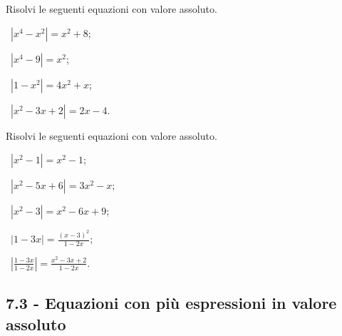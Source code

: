 \begin{esercizio}[\Ast]
 \label{ese:7.14}
Risolvi le seguenti equazioni con valore assoluto.
\begin{multicols}{2}
 \begin{enumeratea}
 \item~$\left|x^4-x^2\right|=x^2+8$;
 \item~$\left|x^4-9\right|=x^2$;
 \item~$\left|1-x^2\right|=4x^2+x$;
 \item~$\left|x^2-3x+2\right|=2x-4$.
 \end{enumeratea}
 \end{multicols}
\end{esercizio}

\begin{esercizio}[\Ast]
 \label{ese:7.15}
Risolvi le seguenti equazioni con valore assoluto.
\begin{multicols}{2}
 \begin{enumeratea}
 \item~$\left|x^2-1\right|=x^2-1$;
 \item~$\left|x^2-5x+6\right|=3x^2-x$;
 \item~$\left|x^2-3\right|=x^2-6x+9$;
 \item~$\left|1-3x\right|=\frac{(x-3)^2}{1-2x}$;
 \item~$\left|\frac{1-3x}{1-2x}\right|=\frac{x^2-3x+2}{1-2x}$.
 \end{enumeratea}
 \end{multicols}
\end{esercizio}
\subsection*{7.3 - Equazioni con più espressioni in valore assoluto}

